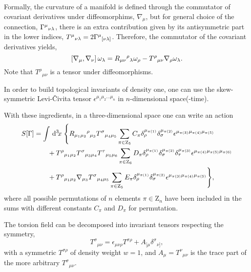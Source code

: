 \documentclass[%
  showpacs,showkeys,prd,superscriptaddress]{revtex4-1}
\begin{document}
Formally, the curvature of a manifold is defined through the commutator of covariant derivatives under diffeomorphims, $\nabla_\mu$, but for general choice of the connection, $\Gamma^\mu{}_{\nu\lambda}$, there is an extra contribution given by its antisymmetric part in the lower indices, $T^\mu{}_{\nu\lambda}=2\Gamma^\mu{}_{[\nu\lambda]}$. Therefore, the commutator of the covariant derivatives yields,
\begin{equation}
  \left[\nabla_{{\mu}},\nabla_{{\nu}}\right]\omega_\lambda = R_{\mu\nu}{}^\rho{}_\lambda \omega _\rho - T^\rho{}_{\mu\nu}\nabla_{{\rho}}\omega_\lambda.\label{curvdef}
\end{equation}
Note that $T^\rho{}_{\mu\nu}$ is a  tensor under diffeomorphisms.

In order to build topological invariants of density one, one can use the skew-symmetric Levi-\v{C}ivita tensor $\epsilon^{\mu_1\mu_2\dots\mu_n}$ in $n$-dimensional space(-time).

With these ingredients, in a three-dimensional space one can write an action 
\begin{align}
  \label{accion3d}
  S[\Gamma] &=
  \int \,{\mathrm{d}}^{3}\!{x}\; \Bigg\{R_{\mu_1\mu_2}{}^\rho{}_{\mu_3} T^\sigma{}_{\mu_4\mu_5}\sum_{\pi \in  \mathrm{Z}_5}C_\pi\delta_\rho^{\mu_{\pi(1)}} \delta_\sigma^{\mu_{\pi(2)}}\epsilon^{\mu_{\pi(3)}\mu_{\pi(4)}\mu_{\pi(5)}} \notag\\ 
  & \qquad + T^\rho{}_{\mu_1\mu_2} T^\sigma{}_{\mu_3\mu_4}T^\tau{}_{\mu_5\mu_6} \sum_{\pi \in \mathrm{Z}_6}D_\pi\delta_\rho^{\mu_{\pi(1)}} \delta_\sigma^{\mu_{\pi(2)}}\delta_\tau^{\mu_{\pi(3)}}\epsilon^{\mu_{\pi(4)}\mu_{\pi(5)}\mu_{\pi(6)}} \notag\\
  & \qquad  +T^\rho{}_{\mu_1\mu_2}\nabla_{\mu_3} T^\sigma{}_{\mu_4\mu_5}\sum_{\pi \in \mathrm Z_5}E_\pi\delta_\rho^{\mu_{\pi(1)}} \delta_\sigma^{\mu_{\pi(2)}}\epsilon^{\mu_{\pi(3)}\mu_{\pi(4)}\mu_{\pi(5)}} \Bigg\}, 
\end{align}
where all possible permutations of $n$ elements $\pi\in\mathrm{Z}_n$ have been included in the sums with  different constants $C_\pi$ and $D_\pi$ for  permutation. %

The torsion field can be decomposed into invariant tensors respecting the symmetry,
\begin{equation}
  T^\sigma{}_{\mu\nu}=\epsilon_{\mu\nu\rho} T^{\sigma\rho}+A_{[\mu}\delta^\sigma{}_{\nu]},
\end{equation}
with a symmetric $T^{\sigma\rho}$ of density weight  $w =1$, and $A_\mu=T^\nu{}_{\mu\nu}$ is the trace part of the more arbitrary $T^\sigma{}_{\mu\nu}$.
\end{document}

